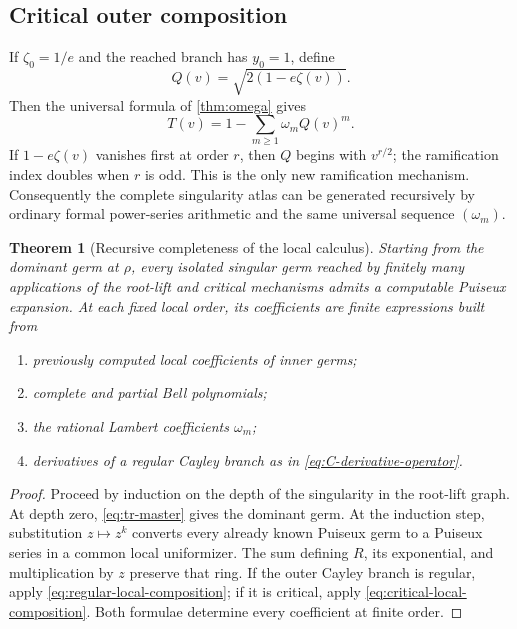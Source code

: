 \documentclass[11pt,a4paper,oneside,openany]{book}
\newtheorem{theorem}{Theorem}[chapter]
\theoremstyle{definition}
\theoremstyle{remark}
\begin{document}
\subsection{Critical outer composition}
If $\zeta_0=1/e$ and the reached branch has $y_0=1$, define
\begin{equation}
 Q(v)=\sqrt{2(1-e\zeta(v))}.
 \label{eq:Q-local}
\end{equation}
Then the universal formula of \cref{thm:omega} gives
\begin{equation}
 \boxed{
 T(v)=1-\sum_{m\ge1}\omega_m Q(v)^m.}
 \label{eq:critical-local-composition}
\end{equation}
If $1-e\zeta(v)$ vanishes first at order $r$, then $Q$ begins with
$v^{r/2}$; the ramification index doubles when $r$ is odd.  This is the only
new ramification mechanism.  Consequently the complete singularity atlas can
be generated recursively by ordinary formal power-series arithmetic and the
same universal sequence $(\omega_m)$.

\begin{theorem}[Recursive completeness of the local calculus]
\label{thm:local-completeness}
Starting from the dominant germ at $\rho$, every isolated singular germ reached
by finitely many applications of the root-lift and critical mechanisms admits a
computable Puiseux expansion.  At each fixed local order, its coefficients are
finite expressions built from
\begin{enumerate}
\item previously computed local coefficients of inner germs;
\item complete and partial Bell polynomials;
\item the rational Lambert coefficients $\omega_m$;
\item derivatives of a regular Cayley branch as in
      \cref{eq:C-derivative-operator}.
\end{enumerate}
\end{theorem}

\begin{proof}
Proceed by induction on the depth of the singularity in the root-lift graph.
At depth zero, \cref{eq:tr-master} gives the dominant germ.  At the induction
step, substitution $z\mapsto z^k$ converts every already known Puiseux germ to
a Puiseux series in a common local uniformizer.  The sum defining $R$, its
exponential, and multiplication by $z$ preserve that ring.  If the outer Cayley
branch is regular, apply \cref{eq:regular-local-composition}; if it is critical,
apply \cref{eq:critical-local-composition}.  Both formulae determine every
coefficient at finite order.
\end{proof}
\end{document}
